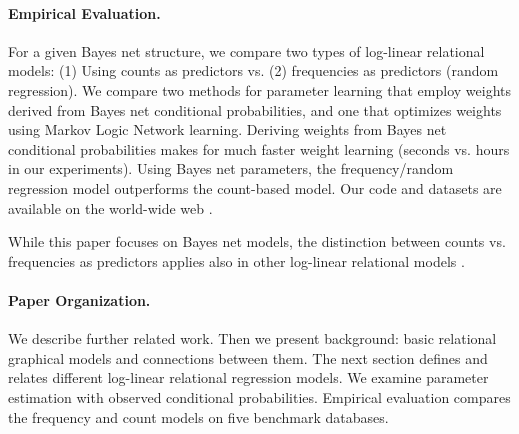 \documentclass[twoside,leqno,twocolumn]{article}
\begin{document}
\paragraph{Empirical Evaluation.} 
For a given Bayes net structure, we compare two types of log-linear relational models: (1) Using counts as predictors vs. (2) frequencies as predictors (random regression). We compare two methods for parameter learning that employ weights derived from Bayes net conditional probabilities, and one that optimizes weights using Markov Logic Network learning. 
%
Deriving weights from Bayes net conditional probabilities makes for much faster weight learning (seconds vs. hours in our experiments).
%
Using Bayes net parameters, the frequency/random regression model outperforms the count-based model. Our code and datasets are available on the world-wide web \cite{bib:jbnsite}. 

While this paper focuses on Bayes net models, the distinction between counts vs. frequencies as predictors applies also in other log-linear relational models \cite{Natarajan2012,Khot2011}. 
\paragraph{Paper Organization.}
We describe further related work. Then we present background: basic relational graphical models and connections between them. The next section defines and relates different log-linear relational regression models. We examine parameter estimation with observed conditional probabilities.
Empirical evaluation compares the frequency and count models on five benchmark databases. 
\end{document}
